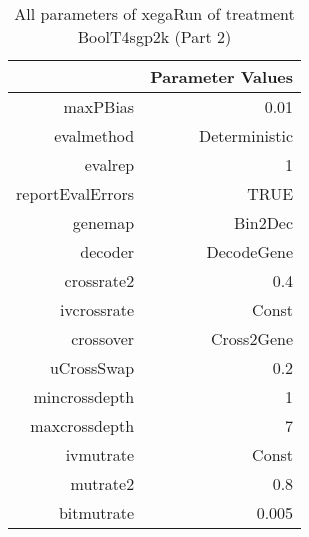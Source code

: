 \begin{table}[ht]
\centering
\begin{tabular}{rr}
  \hline
 & Parameter Values \\ 
  \hline
maxPBias & 0.01 \\ 
  evalmethod & Deterministic \\ 
  evalrep & 1 \\ 
  reportEvalErrors & TRUE \\ 
  genemap & Bin2Dec \\ 
  decoder & DecodeGene \\ 
  crossrate2 & 0.4 \\ 
  ivcrossrate & Const \\ 
  crossover & Cross2Gene \\ 
  uCrossSwap & 0.2 \\ 
  mincrossdepth & 1 \\ 
  maxcrossdepth & 7 \\ 
  ivmutrate & Const \\ 
  mutrate2 & 0.8 \\ 
  bitmutrate & 0.005 \\ 
   \hline
\end{tabular}
\caption{ All parameters of xegaRun of treatment BoolT4sgp2k 
 (Part 2)} 
\end{table}
